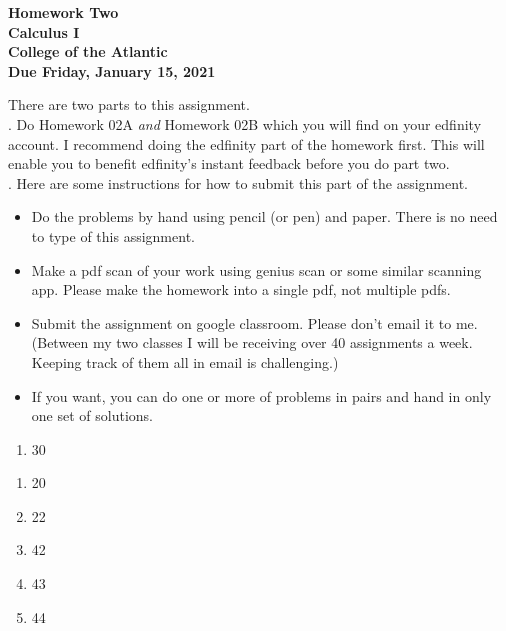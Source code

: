 \documentclass[12pt]{article}
\begin{document}
\pagestyle{empty}
 
\begin{center}
{\LARGE {\bf Homework Two}}\\
\bigskip
{\Large {\bf Calculus I}}\\
\bigskip
{\Large {\bf College of the Atlantic}}\\
\bigskip
{ {\bf Due Friday, January 15, 2021}}\\ 
\end{center}
\medskip


\noindent There are two parts to this assignment.\\

.  Do Homework 02A \emph{and} Homework
02B which you will find on your edfinity account.  I recommend doing
the edfinity part of the homework first.  This will enable you to
benefit edfinity's instant feedback before you do part two.\\ 


.  Here are some
instructions for how to submit this part of the assignment.
\begin{itemize}
\item Do the problems by hand using pencil (or pen) and paper.
  There is no need to type of this assignment.
\item Make a pdf scan of your work using genius scan or some
  similar scanning app.  Please make the homework into a single
  pdf, not multiple pdfs.
\item Submit the assignment on google classroom.  Please don't
  email it to me.  (Between my two classes I will be receiving
  over 40 assignments a week.  Keeping track of them all in email
  is challenging.)
\item If you want, you can do one or more of problems in pairs and hand 
  in only one set of solutions.\\
\end{itemize}


\begin{enumerate}
\setlength{\itemsep}{-1mm}
  \item 30

\end{enumerate}



\begin{enumerate}
\setlength{\itemsep}{-1mm}
\item 20
\item 22
\item 42
\item 43
\item 44
\end{enumerate}
\end{document}
